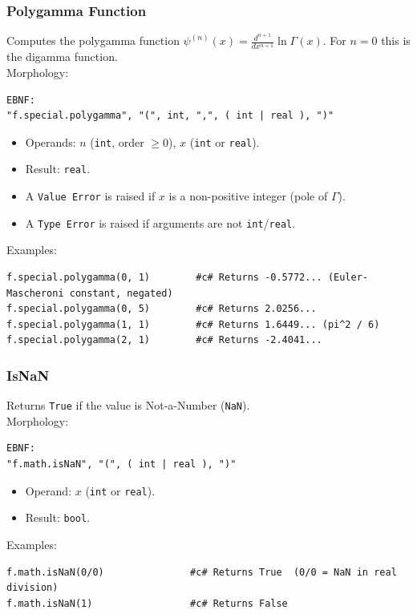 
\subsubsection{Polygamma Function}
Computes the polygamma function $\psi^{(n)}(x) = \frac{d^{n+1}}{dx^{n+1}} \ln \Gamma(x)$. For $n=0$ this is the digamma function. \\
Morphology:
\begin{verbatim}
EBNF:
"f.special.polygamma", "(", int, ",", ( int | real ), ")"
\end{verbatim}
\begin{itemize}
\item Operands: $n$ (\texttt{int}, order $\geq 0$), $x$ (\texttt{int} or \texttt{real}).
\item Result: \texttt{real}.
\item A \texttt{Value Error} is raised if $x$ is a non-positive integer (pole of $\Gamma$).
\item A \texttt{Type Error} is raised if arguments are not \texttt{int}/\texttt{real}.
\end{itemize}
Examples:
\begin{verbatim}
f.special.polygamma(0, 1)        #c# Returns -0.5772... (Euler-Mascheroni constant, negated)
f.special.polygamma(0, 5)        #c# Returns 2.0256...
f.special.polygamma(1, 1)        #c# Returns 1.6449... (pi^2 / 6)
f.special.polygamma(2, 1)        #c# Returns -2.4041...
\end{verbatim}

\subsubsection{IsNaN}
Returns \texttt{True} if the value is Not-a-Number (\texttt{NaN}). \\
Morphology:
\begin{verbatim}
EBNF:
"f.math.isNaN", "(", ( int | real ), ")"
\end{verbatim}
\begin{itemize}
\item Operand: $x$ (\texttt{int} or \texttt{real}).
\item Result: \texttt{bool}.
\end{itemize}
Examples:
\begin{verbatim}
f.math.isNaN(0/0)               #c# Returns True  (0/0 = NaN in real division)
f.math.isNaN(1)                 #c# Returns False
\end{verbatim}

